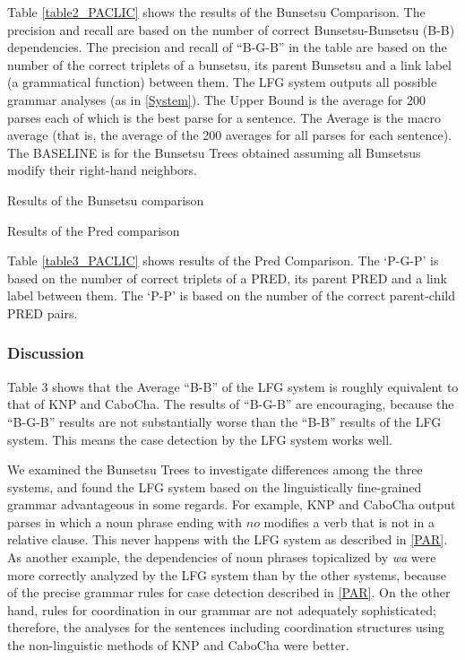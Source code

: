 \documentclass[english]{jnlp_1.4_rep}
\begin{document}
Table \ref{table2_PACLIC} shows the results of the Bunsetsu
Comparison.  The precision and recall are based on the number of
correct Bunsetsu-Bunsetsu (B-B) dependencies.  The precision and
recall of ``B-G-B'' in the table are based on the number of the correct
triplets of a bunsetsu, its parent Bunsetsu and a link label (a
grammatical function) between them.  The LFG system outputs all
possible grammar analyses (as in \ref{System}).  The Upper Bound is
the average for 200 parses each of which is the best parse for a
sentence.  The Average is the macro average (that is, the average of
the 200 averages for all parses for each sentence).  The BASELINE is
for the Bunsetsu Trees obtained assuming all Bunsetsus modify their
right-hand neighbors.

\begin{table}[b]
\caption{Results of the Bunsetsu comparison}
\label{table2_PACLIC}

\end{table}
\begin{table}[b]
\caption{Results of the Pred comparison}
\label{table3_PACLIC}

\vspace{-1\Cvs}
\end{table}

Table \ref{table3_PACLIC} shows results of the Pred Comparison.  The `P-G-P' is based on the number of correct triplets of a PRED, its parent PRED and a link label between them.  The `P-P' is based on the number of the correct parent-child PRED pairs. 


\subsubsection{Discussion} 

Table 3 shows that the Average ``B-B'' of the LFG system is roughly
equivalent to that of KNP and CaboCha.  The results of ``B-G-B'' are
encouraging, because the ``B-G-B'' results are not substantially worse
than the ``B-B'' results of the LFG system.  This means the case
detection by the LFG system works well.

We examined the Bunsetsu Trees to investigate differences among the
three systems, and found the LFG system based on the linguistically
fine-grained grammar advantageous in some regards.  For example, KNP
and CaboCha output parses in which a noun phrase ending with $no$
modifies a verb that is not in a relative clause.  This never happens
with the LFG system as described in \ref{PAR}.  As another example,
the dependencies of noun phrases topicalized by \textit{wa} were more
correctly analyzed by the LFG system than by the other systems,
because of the precise grammar rules for case detection described in
\ref{PAR}.  On the other hand, rules for coordination in our grammar
are not adequately sophisticated; therefore, the analyses for the
sentences including coordination structures using the non-linguistic
methods of KNP and CaboCha were better.
\end{document}
